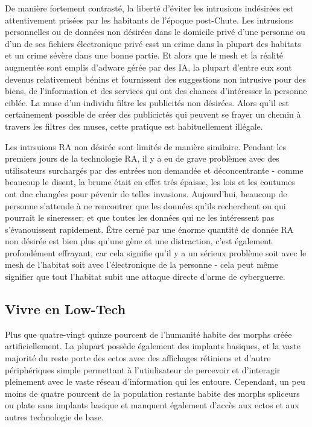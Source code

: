                De manière fortement contrasté, la liberté d'éviter les intrusions indésirées est attentivement prisées par les habitants de l'époque post-Chute. Les intrusions personnelles ou de données non désirées dans le domicile privé d'une personne ou d'un de ses fichiers électronique privé esst un crime dans la plupart des habitats et un crime sévère dans une bonne partie. Et alors que le mesh et la réalité augmentée sont emplis d'adware gérée par des IA, la plupart d'entre eux sont devenus relativement bénins et fournissent des suggestions non intrusive pour des biens, de l'information et des services qui ont des chances d'intéresser la personne ciblée. La muse d'un individu filtre les publicités non désirées. Alors qu'il est certainement possible de créer des publicictés qui peuvent se frayer un chemin à travers les filtres des muses, cette pratique est habituellement illégale. 

               Les intrsuions RA non désirée sont limités de manière similaire. Pendant les premiers jours de la technologie RA, il y a eu de grave problèmes avec des utilisateurs surchargés par des entrées non demandée et déconcentrante - comme beaucoup le disent, la brume était en effet trés épaisse, les lois et les coutumes ont dnc changées pour pévenir de telles invasions. Aujourd'hui, beaucoup de personne s'attende à ne rencontrer que les données qu'ils recherchent ou qui pourrait le sineresser; et que toutes les données qui ne les intéressent pas s'évanouissent rapidement. Être cerné par une énorme quantité de donnée RA non désirée est bien plus qu'une gène et une distraction, c'est également profondément effrayant, car cela signifie qu'il y a un sérieux problème soit avec le mesh de l'habitat soit avec l'électronique de la personne - cela peut même signifier que tout l'habitat subit une attaque directe d'arme de cyberguerre. 

               \subsection{Vivre en Low-Tech} \label{sec:low-tech-existence} 

               Plus que quatre-vingt quinze pourcent de l'humanité habite des morphs créée artificiellement. La plupart possède également des implants basiques, et la vaste majorité du reste porte des ectos avec des affichages rétiniens et d'autre périphériques simple permettant à l'utiulisateur de percevoir et d'interagir pleinement avec le vaste réseau d'information qui les entoure. Cependant, un peu moins de quatre pourcent de la population restante habite des morphs spliceurs ou plate sans implants basique et manquent également d'accès aux ectos et aux autres technologie de base. 

